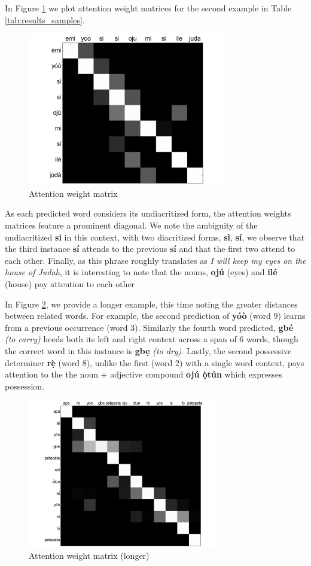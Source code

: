 \documentclass[a4paper]{article}
\begin{document}
In Figure \ref{fig:attention_weights_emiyoo} we plot attention weight matrices for the second example in Table \ref{tab:results_samples}.
\begin{figure}[h]
  \centering
  \includegraphics[width=3.4in]{emi_yoo_AttentionWeights.pdf}
  \caption{Attention weight matrix}
  \label{fig:attention_weights_emiyoo}
\end{figure}
As each predicted word considers its undiacritized form, the attention weights matrices feature a prominent diagonal. We note the ambiguity of the undiacritized \textbf{si} in this context, with two diacritized forms, \textbf{s{\`i}}, \textbf{s{\'i}}, we observe that the third instance \textbf{s{\'i}} attends to the previous \textbf{s{\'i}} and that the first two attend to each other. Finally, as this phrase roughly translates as \emph{I will keep my eyes on the house of Judah}, it is interesting to note that the nouns, \textbf{oj{\'u}} (eyes) and \textbf{il{\'e}} (house) pay attention to each other 

In Figure \ref{fig:attention_weights_patapata}, we provide a longer example, this time noting the greater distances between related words. For example, the second prediction of \textbf{y{\'o}{\`o}} (word 9) learns from a previous occurrence (word 3). Similarly the fourth word predicted, \textbf{gb{\'e}} \emph{(to carry)} heeds both its left and right context across a span of 6 words, though the correct word in this instance is \textbf{gb\d{e}} \emph{(to dry)}. Lastly, the second possessive determiner \textbf{r\d{\`e}} (word 8), unlike the first (word 2) with a single word context, pays attention to the the noun + adjective compound \textbf{oj{\'u} \textbf{\d{\`o}t{\'u}n}} which expresses possession.
\begin{figure}[h]
  \centering
  \includegraphics[width=3.3in]{patapata_AttentionWeights.pdf}
  \caption{Attention weight matrix (longer)}
  \label{fig:attention_weights_patapata}
\end{figure}
\end{document}
